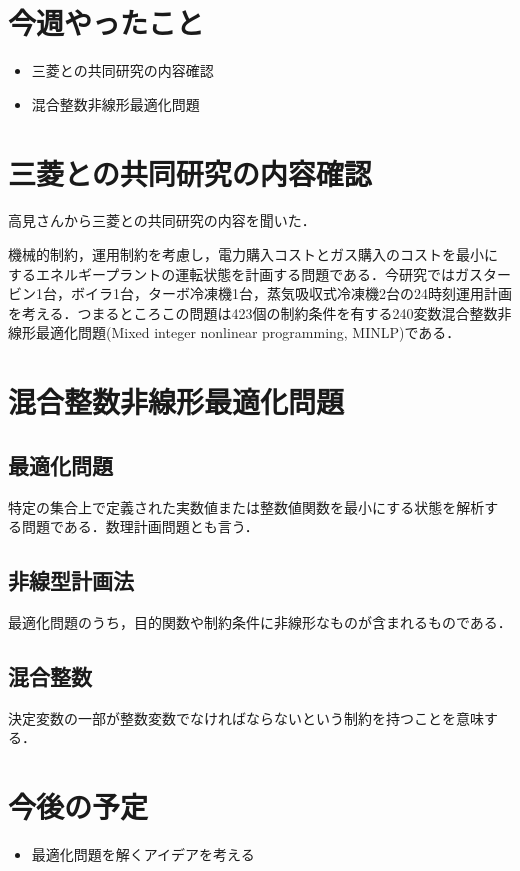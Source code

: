 \documentclass[twocolumn]{jarticle}
\begin{document}


\section{今週やったこと}
\begin{itemize}
  \item 三菱との共同研究の内容確認
  \item 混合整数非線形最適化問題
\end{itemize}


\section{三菱との共同研究の内容確認}
高見さんから三菱との共同研究の内容を聞いた．

機械的制約，運用制約を考慮し，電力購入コストとガス購入のコストを最小にするエネルギープラントの運転状態を計画する問題である．今研究ではガスタービン1台，ボイラ1台，ターボ冷凍機1台，蒸気吸収式冷凍機2台の24時刻運用計画を考える．つまるところこの問題は423個の制約条件を有する240変数混合整数非線形最適化問題(Mixed integer nonlinear programming, MINLP)である．

\section{混合整数非線形最適化問題}

\subsection{最適化問題}
特定の集合上で定義された実数値または整数値関数を最小にする状態を解析する問題である．数理計画問題とも言う．

\subsection{非線型計画法}
最適化問題のうち，目的関数や制約条件に非線形なものが含まれるものである．

\subsection{混合整数}
決定変数の一部が整数変数でなければならないという制約を持つことを意味する．

\section{今後の予定}

\begin{itemize}
  \item 最適化問題を解くアイデアを考える
\end{itemize}

\end{document}
